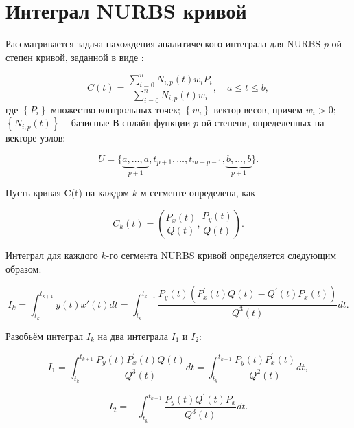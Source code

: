 \documentclass{article}
\begin{document}
\tableofcontents

\pagebreak
\section{Интеграл  NURBS кривой}

Рассматривается задача нахождения аналитического интеграла для NURBS $p$-ой степен кривой, заданной в виде \cite{nurbs_book}:

\begin{equation} \label{NURBS_def}
    C(t)=\frac{\sum_{i=0}^{n} N_{i, p}(t) w_{i} P_{i}}{\sum_{i=0}^{n} N_{i, p}(t) w_{i}}, \quad a \leq t \leq b,
\end{equation}
где $\left\{P_{i}\right\}$ множество контрольных точек; $\left\{w_{i}\right\}$ вектор весов, причем $w_i>0$;\\
$\left\{N_{i, p}(t)\right\}$ -- базисные В-сплайн функции $p$-ой степени, определенных на векторе узлов:

\[
    U=\{\underbrace{a, \ldots, a}_{p+1}, t_{p+1}, \ldots, t_{m-p-1}, \underbrace{b, \ldots, b}_{p+1}\}.
\]

Пусть кривая C(t) на каждом $k$-м сегменте определена, как 

\begin{equation} \label{NURBS}
    C_k(t)=\left( \frac{P_x(t)}{Q(t)}, \frac{P_y(t)}{Q(t)} \right).
\end{equation}

Интеграл для каждого $k$-го сегмента NURBS кривой определяется следующим образом:

\begin{equation} \label{NURBS_integral_segment}
	I_k = \int_{t_{k}}^{t_{k+1}} y(t) x'(t) d t = 
	\int_{t_{k}}^{t_{k+1}} \frac{P_{y}(t)\left(P_{x}^{\prime}(t) Q(t)-Q^{\prime}(t) P_{x}(t)\right)}{Q^{3}(t)} d t. 
\end{equation}

Разобьём интеграл $I_k$ на два интеграла $I_1$ и $ I_2$:

\begin{equation} \label{I_1_before}
	I_1 =  \int_{t_{k}}^{t_{k+1}} \frac{P_{y}(t) P_{x}^{\prime}(t) Q(t)}{Q^{3}(t)}dt =  \int_{t_{k}}^{t_{k+1}} \frac{P_{y}(t) P_{x}^{\prime}(t)}{Q^{2}(t)}dt,
\end{equation}

\begin{equation} 
	I_2 =  - \int_{t_{k}}^{t_{k+1}} \frac{P_{y}(t) Q^{\prime}(t) P_{x}}{Q^{3}(t)}dt.
\end{equation}
\end{document}
